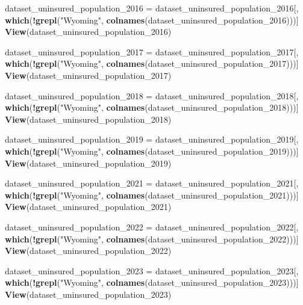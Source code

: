 \documentclass[
]{article}
\newenvironment{Shaded}{\begin{snugshade}}{\end{snugshade}}
\newcommand{\FunctionTok}[1]{\textcolor[rgb]{0.13,0.29,0.53}{\textbf{#1}}}
\newcommand{\NormalTok}[1]{#1}
\newcommand{\OtherTok}[1]{\textcolor[rgb]{0.56,0.35,0.01}{#1}}
\newcommand{\SpecialCharTok}[1]{\textcolor[rgb]{0.81,0.36,0.00}{\textbf{#1}}}
\newcommand{\StringTok}[1]{\textcolor[rgb]{0.31,0.60,0.02}{#1}}
\begin{document}
\begin{Shaded}
\begin{Highlighting}[]
\NormalTok{dataset\_uninsured\_population\_2016 }\OtherTok{=}\NormalTok{ dataset\_uninsured\_population\_2016[, }\FunctionTok{which}\NormalTok{(}\SpecialCharTok{!}\FunctionTok{grepl}\NormalTok{(}\StringTok{"Wyoming"}\NormalTok{, }\FunctionTok{colnames}\NormalTok{(dataset\_uninsured\_population\_2016)))]}
\FunctionTok{View}\NormalTok{(dataset\_uninsured\_population\_2016)}

\NormalTok{dataset\_uninsured\_population\_2017 }\OtherTok{=}\NormalTok{ dataset\_uninsured\_population\_2017[, }\FunctionTok{which}\NormalTok{(}\SpecialCharTok{!}\FunctionTok{grepl}\NormalTok{(}\StringTok{"Wyoming"}\NormalTok{, }\FunctionTok{colnames}\NormalTok{(dataset\_uninsured\_population\_2017)))]}
\FunctionTok{View}\NormalTok{(dataset\_uninsured\_population\_2017)}

\NormalTok{dataset\_uninsured\_population\_2018 }\OtherTok{=}\NormalTok{ dataset\_uninsured\_population\_2018[, }\FunctionTok{which}\NormalTok{(}\SpecialCharTok{!}\FunctionTok{grepl}\NormalTok{(}\StringTok{"Wyoming"}\NormalTok{, }\FunctionTok{colnames}\NormalTok{(dataset\_uninsured\_population\_2018)))]}
\FunctionTok{View}\NormalTok{(dataset\_uninsured\_population\_2018)}

\NormalTok{dataset\_uninsured\_population\_2019 }\OtherTok{=}\NormalTok{ dataset\_uninsured\_population\_2019[, }\FunctionTok{which}\NormalTok{(}\SpecialCharTok{!}\FunctionTok{grepl}\NormalTok{(}\StringTok{"Wyoming"}\NormalTok{, }\FunctionTok{colnames}\NormalTok{(dataset\_uninsured\_population\_2019)))]}
\FunctionTok{View}\NormalTok{(dataset\_uninsured\_population\_2019)}

\NormalTok{dataset\_uninsured\_population\_2021 }\OtherTok{=}\NormalTok{ dataset\_uninsured\_population\_2021[, }\FunctionTok{which}\NormalTok{(}\SpecialCharTok{!}\FunctionTok{grepl}\NormalTok{(}\StringTok{"Wyoming"}\NormalTok{, }\FunctionTok{colnames}\NormalTok{(dataset\_uninsured\_population\_2021)))]}
\FunctionTok{View}\NormalTok{(dataset\_uninsured\_population\_2021)}

\NormalTok{dataset\_uninsured\_population\_2022 }\OtherTok{=}\NormalTok{ dataset\_uninsured\_population\_2022[, }\FunctionTok{which}\NormalTok{(}\SpecialCharTok{!}\FunctionTok{grepl}\NormalTok{(}\StringTok{"Wyoming"}\NormalTok{, }\FunctionTok{colnames}\NormalTok{(dataset\_uninsured\_population\_2022)))]}
\FunctionTok{View}\NormalTok{(dataset\_uninsured\_population\_2022)}

\NormalTok{dataset\_uninsured\_population\_2023 }\OtherTok{=}\NormalTok{ dataset\_uninsured\_population\_2023[, }\FunctionTok{which}\NormalTok{(}\SpecialCharTok{!}\FunctionTok{grepl}\NormalTok{(}\StringTok{"Wyoming"}\NormalTok{, }\FunctionTok{colnames}\NormalTok{(dataset\_uninsured\_population\_2023)))]}
\FunctionTok{View}\NormalTok{(dataset\_uninsured\_population\_2023)}


\end{Highlighting}
\end{Shaded}
\end{document}
